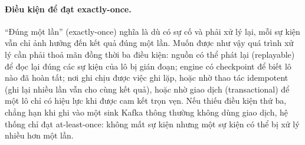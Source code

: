 \paragraph{Điều kiện để đạt exactly-once.}
``Đúng một lần'' (exactly-once) nghĩa là dù có sự cố và phải xử lý lại, mỗi sự kiện vẫn chỉ ảnh hưởng đến kết quả đúng một lần. Muốn được như vậy quá trình xử lý cần phải thoả mãn đồng thời ba điều kiện: nguồn có thể phát lại (replayable) để đọc lại đúng các sự kiện của lô bị gián đoạn; engine có checkpoint để biết lô nào đã hoàn tất; nơi ghi chịu được việc ghi lặp, hoặc nhờ thao tác idempotent (ghi lại nhiều lần vẫn cho cùng kết quả), hoặc nhờ giao dịch (transactional) để một lô chỉ có hiệu lực khi được cam kết trọn vẹn. Nếu thiếu điều kiện thứ ba, chẳng hạn khi ghi vào một sink Kafka thông thường không dùng giao dịch, hệ thống chỉ đạt at-least-once: không mất sự kiện nhưng một sự kiện có thể bị xử lý nhiều hơn một lần.

